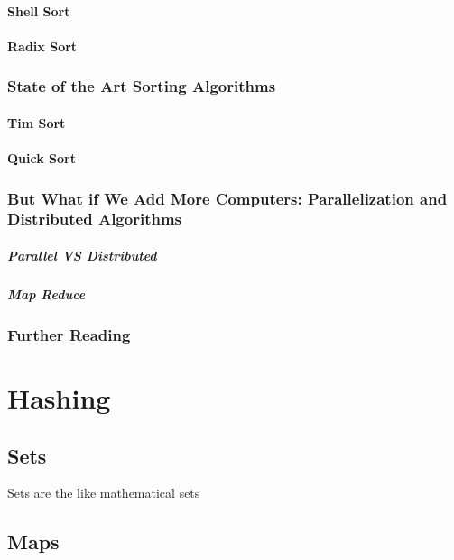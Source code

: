 \documentclass[10pt,a4paper]{book}
\begin{document}
\subsection{Shell Sort}

\subsection{Radix Sort}

\section{State of the Art Sorting Algorithms}

\subsection{Tim Sort}
\subsection{Quick Sort}
\section{But What if We Add More Computers: Parallelization and Distributed Algorithms}



\subsubsection{Parallel VS Distributed}

\subsubsection{Map Reduce }


\section{Further Reading}

\part{Hashing}

\chapter{Sets}
\label{chap-sets}
Sets are the like mathematical sets


\chapter{Maps}
\end{document}
